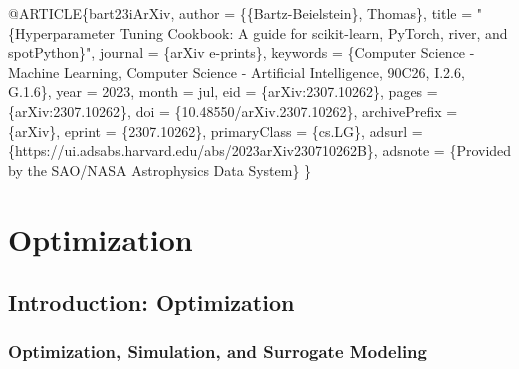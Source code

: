 \documentclass[
  letterpaper,
  DIV=11,
  numbers=noendperiod]{scrreprt}
\newenvironment{Shaded}{\begin{snugshade}}{\end{snugshade}}
\newcommand{\NormalTok}[1]{\textcolor[rgb]{0.00,0.23,0.31}{#1}}
\begin{document}
\begin{Shaded}
\begin{Highlighting}[]
\NormalTok{@ARTICLE\{bart23iArXiv,}
\NormalTok{      author = \{\{Bartz{-}Beielstein\}, Thomas\},}
\NormalTok{      title = "\{Hyperparameter Tuning Cookbook:}
\NormalTok{          A guide for scikit{-}learn, PyTorch, river, and spotPython\}",}
\NormalTok{     journal = \{arXiv e{-}prints\},}
\NormalTok{    keywords = \{Computer Science {-} Machine Learning,}
\NormalTok{      Computer Science {-} Artificial Intelligence, 90C26, I.2.6, G.1.6\},}
\NormalTok{         year = 2023,}
\NormalTok{        month = jul,}
\NormalTok{          eid = \{arXiv:2307.10262\},}
\NormalTok{        pages = \{arXiv:2307.10262\},}
\NormalTok{          doi = \{10.48550/arXiv.2307.10262\},}
\NormalTok{archivePrefix = \{arXiv\},}
\NormalTok{       eprint = \{2307.10262\},}
\NormalTok{ primaryClass = \{cs.LG\},}
\NormalTok{       adsurl = \{https://ui.adsabs.harvard.edu/abs/2023arXiv230710262B\},}
\NormalTok{      adsnote = \{Provided by the SAO/NASA Astrophysics Data System\}}
\NormalTok{\}}

\end{Highlighting}
\end{Shaded}

\part{Optimization}

\hypertarget{introduction-optimization}{%
\chapter{Introduction: Optimization}\label{introduction-optimization}}

\hypertarget{optimization-simulation-and-surrogate-modeling}{%
\section{Optimization, Simulation, and Surrogate
Modeling}\label{optimization-simulation-and-surrogate-modeling}}
\end{document}
